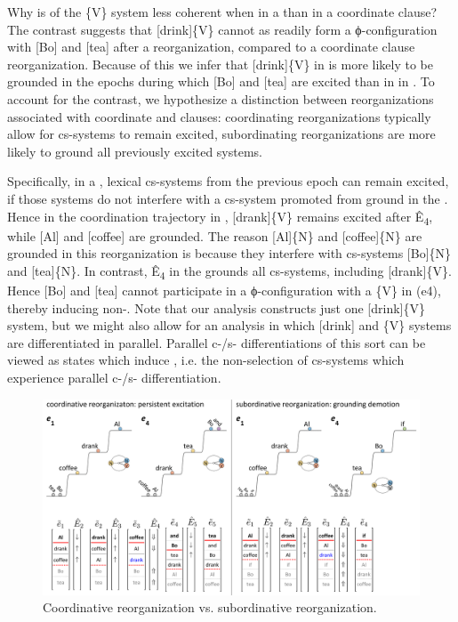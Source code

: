   Why is  of the \{V\} system less coherent when in a  than in a coordinate clause? The  contrast suggests that [drink]\{V\} cannot as readily form a ϕ-con\-fig\-u\-ra\-tion with [Bo] and [tea] after a  reorganization, compared to a coordinate clause reorganization. Because of this we infer that [drink]\{V\} in  is more likely to be grounded in the epochs during which [Bo] and [tea] are excited than in in . To account for the contrast, we hypothesize a distinction between reorganizations associated with coordinate and  clauses: coordinating reorganizations typically allow for cs-systems to remain excited, subordinating reorganizations are more likely to ground all previously excited systems. 

  Specifically, in a , lexical cs-systems from the previous epoch can remain excited, if those systems do not interfere with a cs-system promoted from ground in the . Hence in the coordination trajectory in {}, [drank]\{V\} remains excited after Ê\textsubscript{4}, while [Al] and [coffee] are grounded. The reason [Al]\{N\} and [coffee]\{N\} are grounded in this reorganization is because they interfere with cs-systems [Bo]\{N\} and [tea]\{N\}. In contrast, Ê\textsubscript{4} in the  grounds all cs-systems, including [drank]\{V\}. Hence [Bo] and [tea] cannot participate in a ϕ-con\-fig\-u\-ra\-tion with a \{V\} in (e4), thereby inducing non-. Note that our analysis constructs just one [drink]\{V\} system, but we might also allow for an analysis in which [drink] and \{V\} systems are differentiated in parallel. Parallel c-/s- differentiations of this sort can be viewed as states which induce , i.e. the non-selection of cs-systems which experience parallel c-/s- differentiation.

  
\begin{figure}
\includegraphics[width=\textwidth]{figures/Tilsen-img146.png}
\caption{Coordinative reorganization vs. subordinative reorganization.}
\label{fig:7:2}
\end{figure}
 

